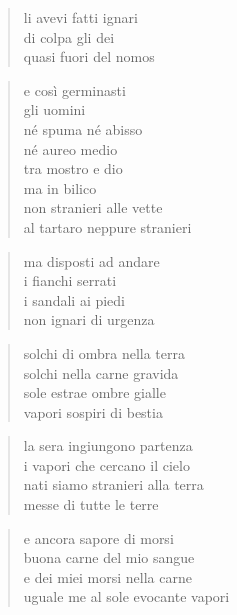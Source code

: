 	\begin{verse}
		li avevi fatti ignari\\
		di colpa gli dei\\
		quasi fuori del nomos
	\end{verse}

	\begin{verse}
		e così germinasti\\
		gli uomini\\
		né spuma né abisso\\
		né aureo medio\\
		tra mostro e dio\\
		ma in bilico\\
		non stranieri alle vette\\
		al tartaro neppure stranieri
	\end{verse}

	\begin{verse}
		ma disposti ad andare\\
		i fianchi serrati\\
		i sandali ai piedi\\
		non ignari di urgenza
	\end{verse}

\clearpage


\vspace*{2cm}

	\begin{verse}
		solchi di ombra nella terra\\
		solchi nella carne gravida\\
		sole estrae ombre gialle\\
		vapori sospiri di bestia
	\end{verse}

	\begin{verse}
		la sera ingiungono partenza\\
		i vapori che cercano il cielo\\
		nati siamo stranieri alla terra\\
		messe di tutte le terre
	\end{verse}

	\begin{verse}
		e ancora sapore di morsi\\
		buona carne del mio sangue\\
		e dei miei morsi nella carne\\
		uguale me al sole evocante vapori
	\end{verse}

